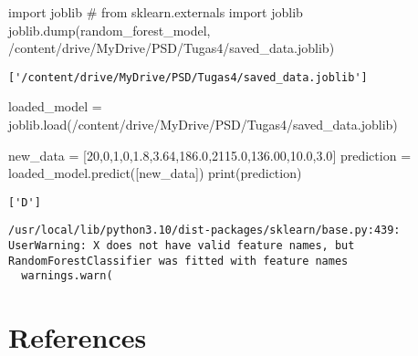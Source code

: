 \documentclass[
  letterpaper,
]{krantz}
\makeatletter
\newenvironment{Shaded}{\begin{snugshade}}{\end{snugshade}}
\newcommand{\BuiltInTok}[1]{\textcolor[rgb]{0.00,0.23,0.31}{#1}}
\newcommand{\CommentTok}[1]{\textcolor[rgb]{0.37,0.37,0.37}{#1}}
\newcommand{\DecValTok}[1]{\textcolor[rgb]{0.68,0.00,0.00}{#1}}
\newcommand{\FloatTok}[1]{\textcolor[rgb]{0.68,0.00,0.00}{#1}}
\newcommand{\ImportTok}[1]{\textcolor[rgb]{0.00,0.46,0.62}{#1}}
\newcommand{\NormalTok}[1]{\textcolor[rgb]{0.00,0.23,0.31}{#1}}
\newcommand{\OperatorTok}[1]{\textcolor[rgb]{0.37,0.37,0.37}{#1}}
\newcommand{\StringTok}[1]{\textcolor[rgb]{0.13,0.47,0.30}{#1}}
\newlength{\cslhangindent}
\newlength{\cslentryspacingunit} %
\newenvironment{CSLReferences}[2] %
 {%
  \setlength{\parindent}{0pt}
  \ifodd #1
  \let\oldpar\par
  \def\par{\hangindent=\cslhangindent\oldpar}
  \fi
  \setlength{\parskip}{#2\cslentryspacingunit}
 }%
 {}
\newenvironment{kframe}{%
\medskip{}
\setlength{\fboxsep}{.8em}
 \def\at@end@of@kframe{}%
 \ifinner\ifhmode%
  \def\at@end@of@kframe{\end{minipage}}%
  \begin{minipage}{\columnwidth}%
 \fi\fi%
 \def\FrameCommand##1{\hskip\@totalleftmargin \hskip-\fboxsep
 \colorbox{shadecolor}{##1}\hskip-\fboxsep
     \hskip-\linewidth \hskip-\@totalleftmargin \hskip\columnwidth}%
 \MakeFramed {\advance\hsize-\width
   \@totalleftmargin\z@ \linewidth\hsize
   \@setminipage}}%
 {\par\unskip\endMakeFramed%
 \at@end@of@kframe}
\renewenvironment{Shaded}{\begin{kframe}}{\end{kframe}}
\makeatother
\begin{document}
\begin{Shaded}
\begin{Highlighting}[]

\ImportTok{import}\NormalTok{ joblib}
\CommentTok{\# from sklearn.externals import joblib}
\NormalTok{joblib.dump(random\_forest\_model, }\StringTok{\textquotesingle{}/content/drive/MyDrive/PSD/Tugas4/saved\_data.joblib\textquotesingle{}}\NormalTok{)}
\end{Highlighting}
\end{Shaded}

\begin{verbatim}
['/content/drive/MyDrive/PSD/Tugas4/saved_data.joblib']
\end{verbatim}

\begin{Shaded}
\begin{Highlighting}[]
\NormalTok{loaded\_model }\OperatorTok{=}\NormalTok{ joblib.load(}\StringTok{\textquotesingle{}/content/drive/MyDrive/PSD/Tugas4/saved\_data.joblib\textquotesingle{}}\NormalTok{)}


\NormalTok{new\_data }\OperatorTok{=}\NormalTok{ [}\DecValTok{20}\NormalTok{,}\DecValTok{0}\NormalTok{,}\DecValTok{1}\NormalTok{,}\DecValTok{0}\NormalTok{,}\FloatTok{1.8}\NormalTok{,}\FloatTok{3.64}\NormalTok{,}\FloatTok{186.0}\NormalTok{,}\FloatTok{2115.0}\NormalTok{,}\FloatTok{136.00}\NormalTok{,}\FloatTok{10.0}\NormalTok{,}\FloatTok{3.0}\NormalTok{]}
\NormalTok{prediction }\OperatorTok{=}\NormalTok{ loaded\_model.predict([new\_data])}
\BuiltInTok{print}\NormalTok{(prediction)}
\end{Highlighting}
\end{Shaded}

\begin{verbatim}
['D']
\end{verbatim}

\begin{verbatim}
/usr/local/lib/python3.10/dist-packages/sklearn/base.py:439: UserWarning: X does not have valid feature names, but RandomForestClassifier was fitted with feature names
  warnings.warn(
\end{verbatim}


\hypertarget{references}{%
\chapter*{References}\label{references}}


\hypertarget{refs}{}
\begin{CSLReferences}{0}{0}
\end{CSLReferences}



\backmatter
\printindex
\end{document}
